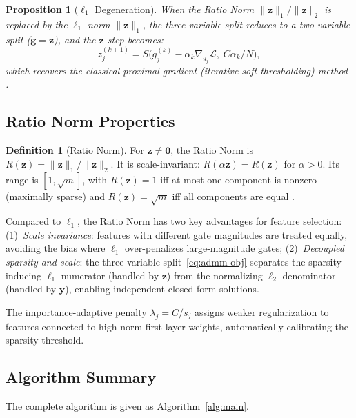 \documentclass{uai2026} %
\newtheorem{proposition}[theorem]{Proposition}
\theoremstyle{definition}
\newtheorem{definition}[theorem]{Definition}
\theoremstyle{remark}
\newcommand{\bz}{\mathbf{z}}
\newcommand{\bg}{\mathbf{g}}
\newcommand{\by}{\mathbf{y}}
\begin{document}
\begin{proposition}[$\ell_1$ Degeneration]\label{prop:l1}
When the Ratio Norm $\lVert\bz\rVert_1/\lVert\bz\rVert_2$ is replaced by the $\ell_1$ norm $\lVert\bz\rVert_1$, the three-variable split reduces to a two-variable split ($\bg = \bz$), and the $\bz$-step becomes:
\begin{equation}
    z_j^{(k+1)} = S\bigl(g_j^{(k)} - \alpha_k\nabla_{g_j}\mathcal{L},\; C\alpha_k/N\bigr),
\end{equation}
which recovers the classical proximal gradient (iterative soft-thresholding) method \citep{parikh2014proximal}.
\end{proposition}

\subsection{Ratio Norm Properties}\label{sec:rationorm}

\begin{definition}[Ratio Norm]
For $\bz \neq \mathbf{0}$, the Ratio Norm is $R(\bz) = \lVert\bz\rVert_1 / \lVert\bz\rVert_2$.
It is scale-invariant: $R(\alpha\bz) = R(\bz)$ for $\alpha > 0$.
Its range is $[1, \sqrt{m}]$, with $R(\bz)=1$ iff at most one component is nonzero (maximally sparse) and $R(\bz) = \sqrt{m}$ iff all components are equal \citep{hoyer2004sparseness}.
\end{definition}

Compared to $\ell_1$, the Ratio Norm has two key advantages for feature selection:
(1)~\emph{Scale invariance}: features with different gate magnitudes are treated equally, avoiding the bias where $\ell_1$ over-penalizes large-magnitude gates;
(2)~\emph{Decoupled sparsity and scale}: the three-variable split~\eqref{eq:admm-obj} separates the sparsity-inducing $\ell_1$ numerator (handled by $\bz$) from the normalizing $\ell_2$ denominator (handled by $\by$), enabling independent closed-form solutions.

The importance-adaptive penalty $\lambda_j = C/s_j$ assigns weaker regularization to features connected to high-norm first-layer weights, automatically calibrating the sparsity threshold.

\subsection{Algorithm Summary}

The complete algorithm is given as Algorithm~\ref{alg:main}.
\end{document}
